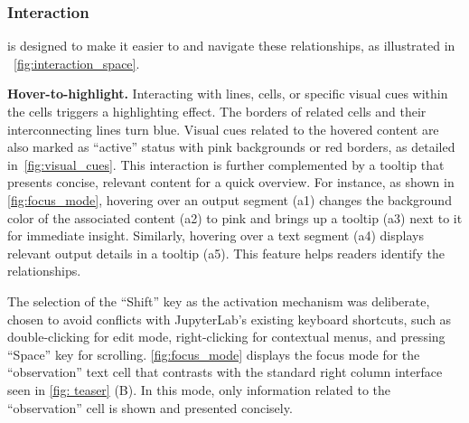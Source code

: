 


\subsubsection{Interaction}
\label{interaction_design}

\tool is designed to make it easier to  and navigate these relationships, as illustrated in ~\autoref{fig:interaction_space}. 
 

\textbf{Hover-to-highlight.}
Interacting with lines, cells, or specific visual cues within the cells triggers a highlighting effect.
The borders of related cells and their interconnecting lines turn blue. 
Visual cues related to the hovered content are also marked as ``active'' status with pink backgrounds or red borders, as detailed in~\autoref{fig:visual_cues}. 
This interaction is further complemented by a tooltip that presents concise, relevant content for a quick overview. 
For instance, as shown in \autoref{fig:focus_mode}, hovering over an output segment (a1) changes the background color of the associated content (a2) to pink and brings up a tooltip (a3) next to it for immediate insight. 
Similarly, hovering over a text segment (a4) displays relevant output details in a tooltip (a5).
This feature helps readers identify the relationships.

The selection of the ``Shift'' key as the activation mechanism was deliberate, chosen to avoid conflicts with JupyterLab's existing keyboard shortcuts, such as double-clicking for edit mode, right-clicking for contextual menus, and pressing  ``Space'' key for scrolling.
\autoref{fig:focus_mode} displays the focus mode for the ``observation'' text cell that contrasts with the standard right column interface seen in \autoref{fig: teaser} (B). 
In this mode, only information related to the ``observation'' cell is shown and presented concisely. 

